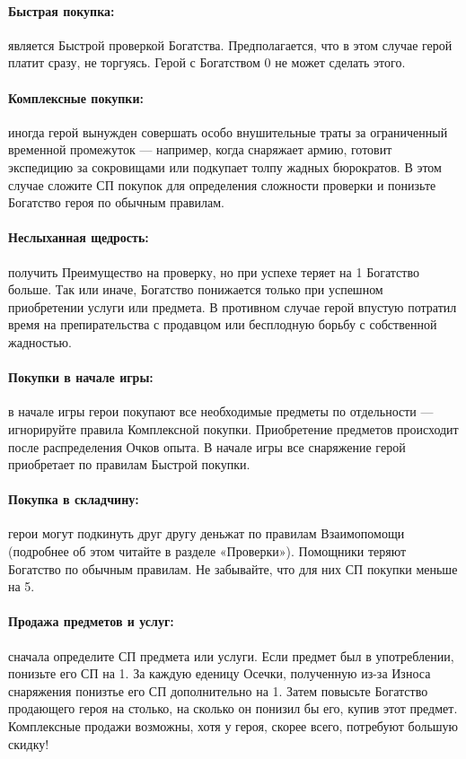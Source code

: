 \paragraph{Быстрая покупка:} является Быстрой проверкой Богатства. Предполагается, что в этом случае герой платит сразу, не торгуясь. Герой с Богатством 0 не может сделать этого.
\paragraph{Комплексные покупки:} иногда герой вынужден совершать особо внушительные траты за ограниченный временной промежуток — например, когда снаряжает армию, готовит экспедицию за сокровищами или подкупает толпу жадных бюрократов. В этом случае сложите СП покупок для определения сложности проверки и понизьте Богатство героя по обычным правилам.
\paragraph{Неслыханная щедрость:} получить Преимущество на проверку, но при успехе теряет на 1 Богатство больше. Так или иначе, Богатство понижается только при успешном приобретении услуги или предмета. В противном случае герой впустую потратил время на препирательства с продавцом или бесплодную борьбу с собственной жадностью.
\paragraph{Покупки в начале игры:} в начале игры герои покупают все необходимые предметы по отдельности — игнорируйте правила Комплексной покупки. Приобретение предметов происходит после распределения Очков опыта. В начале игры все снаряжение герой приобретает по правилам Быстрой покупки.
\paragraph{Покупка в складчину:} герои могут подкинуть друг другу деньжат по правилам Взаимопомощи (подробнее об этом читайте в разделе «Проверки»). Помощники теряют Богатство по обычным правилам. Не забывайте, что для них СП покупки меньше на 5.
\paragraph{Продажа предметов и услуг:} сначала определите СП предмета или услуги. Если предмет был в употреблении, понизьте его СП на 1. За каждую еденицу Осечки, полученную из-за Износа снаряжения понизтье его СП дополнительно на 1. Затем повысьте Богатство продающего героя на столько, на сколько он понизил бы его, купив этот предмет. Комплексные продажи возможны, хотя у героя, скорее всего, потребуют большую скидку!
